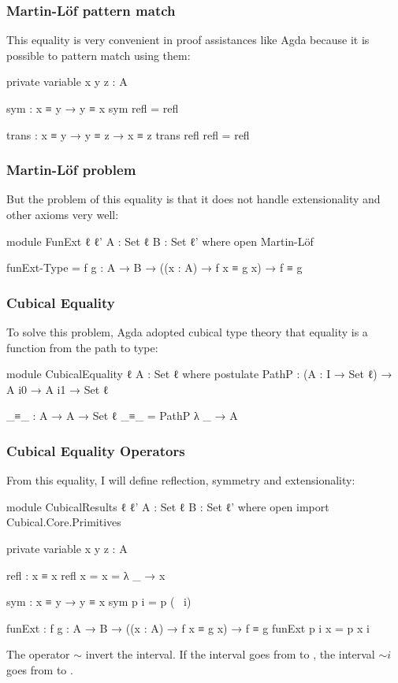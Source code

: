 \documentclass{beamer}
\begin{document}
\begin{frame}
  \frametitle{Martin-Löf pattern match}
  This equality is very convenient in proof assistances like Agda because it is possible to pattern match using them:

  \begin{code}
    private variable
      x y z : A

    sym  : x ≡ y → y ≡ x
    sym refl = refl

    trans : x ≡ y → y ≡ z → x ≡ z
    trans refl refl = refl
  \end{code}
\end{frame}

\begin{frame}
  \frametitle{Martin-Löf problem}

  But the problem of this equality is that it does not handle extensionality and other axioms very well:

  \begin{code}
  module FunExt {ℓ ℓ'} {A : Set ℓ} {B : Set ℓ'} where
    open Martin-Löf

    funExt-Type = {f g : A → B}
      → ((x : A) → f x ≡ g x) → f ≡ g
  \end{code}
\end{frame}

\begin{frame}
  \frametitle{Cubical Equality}
  To solve this problem, Agda adopted cubical type theory that equality is a function from the path to type:

  \begin{code}
  module CubicalEquality {ℓ} {A : Set ℓ} where
    postulate
      PathP : (A : I → Set ℓ) → A i0 → A i1 → Set ℓ

    _≡_ : A → A → Set ℓ
    _≡_ = PathP λ _ → A
  \end{code}
\end{frame}

\begin{frame}
  \frametitle{Cubical Equality Operators}
  From this equality, I will define reflection, symmetry and extensionality:

  \begin{code}
  module CubicalResults {ℓ ℓ'} {A : Set ℓ} {B : Set ℓ'} where
    open import Cubical.Core.Primitives

    private variable
      x y z : A

    refl : x ≡ x
    refl {x = x} = λ _ → x

    sym : x ≡ y → y ≡ x
    sym p i = p (~ i)

    funExt : {f g : A → B}
      → ((x : A) → f x ≡ g x) → f ≡ g
    funExt p i x = p x i
  \end{code}

  The operator $\sim$ invert the interval. If the interval  goes from
   to , the interval $\sim i$ goes from  to .
\end{frame}
\end{document}
